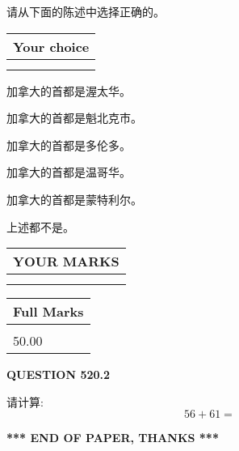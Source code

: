 \documentclass{ctexart}
\begin{document}
  
请从下面的陈述中选择正确的。
  
  
\noindent\hspace{3.0in} \begin{tabular}{|l|}
\hline
Your choice \\
\hline
 \\ 
 \\ 
\hline
\end{tabular}
  
  
 
 
加拿大的首都是渥太华。
 
 
加拿大的首都是魁北克市。
 
 
加拿大的首都是多伦多。
 
 
加拿大的首都是温哥华。
 
 
加拿大的首都是蒙特利尔。
 
 
 上述都不是。
 
 
  
\vspace{0.2in}
  
\noindent\begin{tabular}{|l|}
\hline
 YOUR MARKS  \\
\hline
 \\ 
 \\ 
\hline
\end{tabular}
\hspace{0.05in} \begin{tabular}{|l|}
\hline
 Full Marks  \\
\hline
 \\ 
50.00 \\
\hline
\end{tabular}
{\textbf{\Large{QUESTION
520.2 
}}}
  
  
 
请计算:
\begin{equation}
56 +  %
61 = \nonumber
\end{equation}
 

 

 
   
   
 \vspace{0.2in}
 
   
   
   
   
\vspace{1.0in} 
{\textbf{\large{ *** END OF PAPER, THANKS *** }}} 
   
\end{document}
